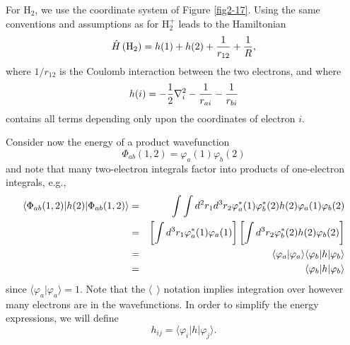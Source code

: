 For H$_2$, we use the coordinate system of Figure \ref{fig2-17}.
Using the same conventions and assumptions as for H$^+_2$ leads to the
Hamiltonian
\begin{equation}
{\hat H} \left( \mathrm{H}_2 \right) = h ( 1 ) + h ( 2 ) + {1 \over
r_{12}} + {1 \over R},
\end{equation}
where $1/r_{12}$ is the Coulomb interaction between the two electrons, and 
where
\begin{equation}
h ( i ) = - {1 \over 2} \nabla^2_i - {1 \over r_{ai}} - {1 \over 
r_{bi}}
\end{equation}
contains all terms depending only upon the coordinates of electron $i$.

Consider now the energy of a product wavefunction
\begin{equation}
\Phi_{ab} ( 1 , 2 ) = \varphi_a ( 1 ) \varphi_b ( 2 )
\end{equation}
and note that many two-electron integrals factor into products of 
one-electron integrals, e.g.,
\begin{eqnarray}
\langle \Phi_{ab} ( 1 , 2 ) | h ( 2 ) | \Phi_{ab} ( 1 , 2 ) 
\rangle &=& \int \int d^2 r_1 d^3 r_2 \varphi^*_a ( 1 ) \varphi^*_b ( 
2 ) h ( 2 ) \varphi_a ( 1 ) \varphi_b ( 2 )\cr
&=& \left[ \int d^3 r_1 \varphi^*_a ( 1 ) \varphi_a ( 1 ) \right] 
\left[ \int d^3 r_2 \varphi^*_b ( 2 ) h ( 2 ) \varphi_b ( 2 ) 
\right]\cr
&=& \langle \varphi_a | \varphi_a \rangle \langle \varphi_b | h | 
\varphi_b \rangle\cr
&=& \langle \varphi_b | h | \varphi_b \rangle
\end{eqnarray}
since $\langle \varphi_a | \varphi_a \rangle = 1$.  Note that the 
$\langle ~~ \rangle$ notation implies integration over however many
electrons are in the wavefunctions. In order to simplify the energy 
expressions, we will define
\begin{equation}
h_{ij} = \langle \varphi_i | h | \varphi_j \rangle.
\end{equation}
  
